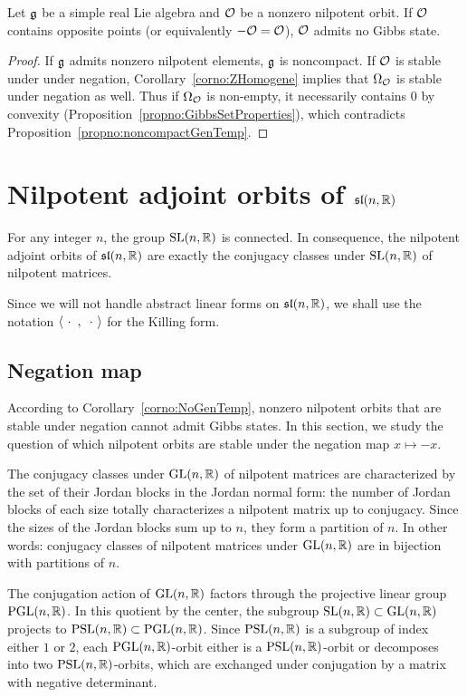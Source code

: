 \documentclass[english]{article}
\begin{document}
\begin{corollary}\label{corno:NoGenTemp}
    Let $\mathfrak g$ be a simple real Lie algebra and $\mathcal{O}$ be a nonzero nilpotent orbit. If $\mathcal{O}$ contains opposite points (or equivalently $-\mathcal{O} = \mathcal{O}$), $\mathcal{O}$ admits no Gibbs state.    
\end{corollary}
\begin{proof}
    If $\mathfrak g$ admits nonzero nilpotent elements, $\mathfrak g$ is noncompact.
    If $\mathcal{O}$ is stable under under negation, Corollary~\ref{corno:ZHomogene} implies that $\Omega_{\mathcal{O}}$ is stable under negation as well. Thus if $\Omega_{\mathcal{O}}$ is non-empty, it necessarily contains $0$ by convexity (Proposition~\ref{propno:GibbsSetProperties}), which contradicts Proposition~\ref{propno:noncompactGenTemp}.
\end{proof}


\section{Nilpotent adjoint orbits of $\mathfrak{sl}(n, \mathbb{R})$}
\label{secno:slnR}

For any integer $n$, the group $\operatorname{SL}(n, \mathbb{R})$ is connected. In consequence, the nilpotent adjoint orbits of $\mathfrak{sl}(n, \mathbb{R})$ are exactly the conjugacy classes under $\operatorname{SL}(n, \mathbb{R})$ of nilpotent matrices.

Since we will not handle abstract linear forms on $\mathfrak{sl}(n, \mathbb{R})$, we shall use the notation $\left\langle {\ \cdot \ } \,,\, {\ \cdot \ } \right\rangle$ for the Killing form.

\subsection{Negation map}
\label{secno:NegationMap}

According to Corollary~\ref{corno:NoGenTemp}, nonzero nilpotent orbits that are stable under negation cannot admit Gibbs states. In this section, we study the question of which nilpotent orbits are stable under the negation map $x\mapsto -x$.

The conjugacy classes under $\operatorname{GL}(n, \mathbb{R})$ of nilpotent matrices are characterized by the set of their Jordan blocks in the Jordan normal form: the number of Jordan blocks of each size totally characterizes a nilpotent matrix up to conjugacy. Since the sizes of the Jordan blocks sum up to $n$, they form a partition of $n$.
In other words: conjugacy classes of nilpotent matrices under $\operatorname{GL}(n, \mathbb{R})$ are in bijection with partitions of $n$.

The conjugation action of $\operatorname{GL}(n, \mathbb{R})$ factors through the projective linear group $\operatorname{PGL}(n, \mathbb{R})$. 
In this quotient by the center, the subgroup $\operatorname{SL}(n, \mathbb{R})\subset \operatorname{GL}(n, \mathbb{R})$ projects to $\operatorname{PSL}(n, \mathbb{R}) \subset \operatorname{PGL}(n, \mathbb{R})$. 
Since $\operatorname{PSL}(n, \mathbb{R})$ is a subgroup of index either $1$ or $2$, each $\operatorname{PGL}(n, \mathbb{R})$-orbit either is a $\operatorname{PSL}(n, \mathbb{R})$-orbit or decomposes into two $\operatorname{PSL}(n, \mathbb{R})$-orbits, which are exchanged under conjugation by a matrix with negative determinant.
\end{document}
